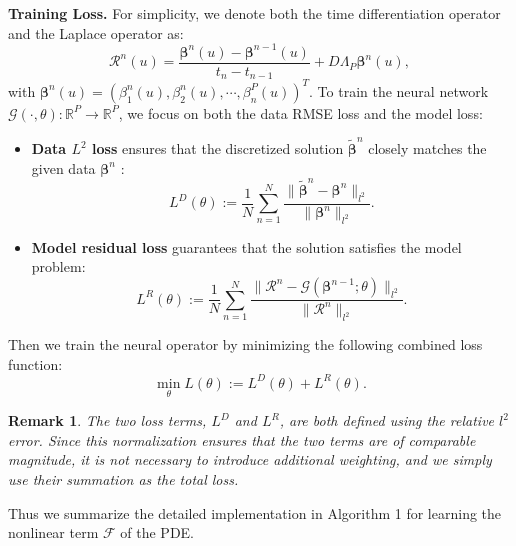 \documentclass[preprint,12pt]{elsarticle}
\theoremstyle{plain}
\newtheorem{remark}{Remark}[section]
\numberwithin{figure}{section}
\numberwithin{table}{section}
\newcommand{\jddd}[1]{{\color{black}#1}}
\begin{document}
{\bf Training Loss.} 
For simplicity, we denote both the time differentiation operator and the Laplace operator as:
\begin{equation}
	\mathcal{R}^n(u) = \frac{\bm{\beta}^n(u)-\bm{\beta}^{n-1}(u) }{t_n-t_{n-1}} + D\Lambda_P \bm{\beta}^n(u),
\end{equation}
with $\bm\beta^n(u)=(\beta_1^n(u),\beta_2^n(u),\cdots,\beta_n^P(u))^T$. To train the neural network $\mathcal{G}(\cdot,\theta):\mathbb{R}^P\rightarrow\mathbb{R}^P$, we focus on both the data RMSE loss and the model loss:
\begin{itemize}
	\item {\textbf{Data $L^2$ loss}
		ensures that the discretized solution $\bm{\widetilde{\beta}}^n$ closely matches the given data $\bm{\beta}^n$     
	}:
	\begin{equation}
		L^D(\theta):= \frac{1}{N}\sum_{n=1}^{N} \frac{\|\bm{\widetilde{\beta}}^n-\bm{\beta}^n\|_{l^2}}{\|\bm{\beta}^n\|_{l^2}}.
	\end{equation}
	\item 	{\textbf{Model residual loss}  guarantees that the solution satisfies the model problem}:
	\begin{equation}
		L^R(\theta):=\frac{1}{N}\sum_{n=1}^{N} \frac{ \|\mathcal{R}^n-\mathcal{G}(\bm{{\beta}}^{n-1};\theta)\|_{l^2}}{\|\mathcal{R}^n\|_{l^2}}.
	\end{equation}
\end{itemize}

Then we train the neural operator by minimizing the following combined loss function:
\begin{equation}
	\min_\theta L(\theta):= L^D(\theta)+L^R(\theta).
\end{equation}

\jddd{
\begin{remark}
    The two loss terms, $L^D$ and $L^R$, are both defined using the relative $l^2$ error. Since this normalization ensures that the two terms are of comparable magnitude, it is not necessary to introduce additional weighting, and we simply use their summation as the total loss.
\end{remark}

}
Thus we summarize the detailed implementation in Algorithm 1 for learning the nonlinear term 
$\mathcal{F}$ of the PDE.
\end{document}

